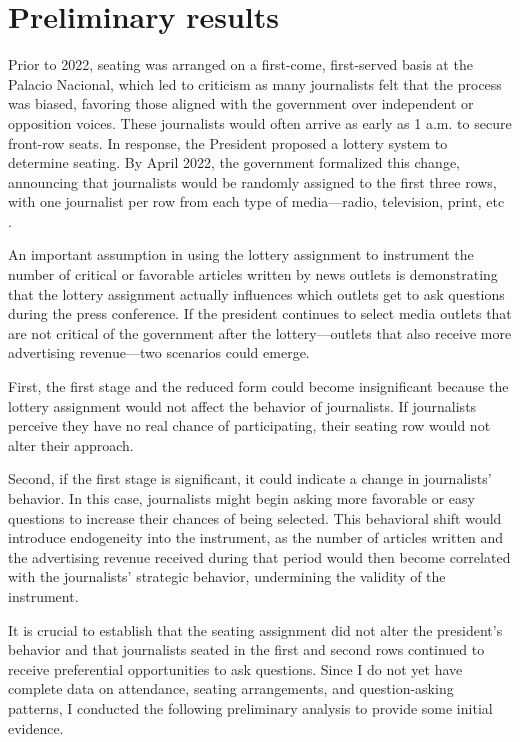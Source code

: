 \section{Preliminary results}

\label{sec:results}

Prior to 2022, seating was arranged on a first-come, first-served basis at the Palacio Nacional, which led to criticism as many journalists felt that the process was biased, favoring those aligned with the government over independent or opposition voices\citep{Tombola-Razon}. These journalists would often arrive as early as 1 a.m. to secure front-row seats. In response, the President proposed a lottery system to determine seating. By April 2022, the government formalized this change, announcing that journalists would be randomly assigned to the first three rows, with one journalist per row from each type of media—radio, television, print, etc \citep{Tombola-Financiero}. 

An important assumption in using the lottery assignment to instrument the number of critical or favorable articles written by news outlets is demonstrating that the lottery assignment actually influences which outlets get to ask questions during the press conference. If the president continues to select media outlets that are not critical of the government after the lottery—outlets that also receive more advertising revenue—two scenarios could emerge.

First, the first stage and the reduced form could become insignificant because the lottery assignment would not affect the behavior of journalists. If journalists perceive they have no real chance of participating, their seating row would not alter their approach.

Second, if the first stage is significant, it could indicate a change in journalists’ behavior. In this case, journalists might begin asking more favorable or easy questions to increase their chances of being selected. This behavioral shift would introduce endogeneity into the instrument, as the number of articles written and the advertising revenue received during that period would then become correlated with the journalists’ strategic behavior, undermining the validity of the instrument.

It is crucial to establish that the seating assignment did not alter the president's behavior and that journalists seated in the first and second rows continued to receive preferential opportunities to ask questions. Since I do not yet have complete data on attendance, seating arrangements, and question-asking patterns, I conducted the following preliminary analysis to provide some initial evidence.

